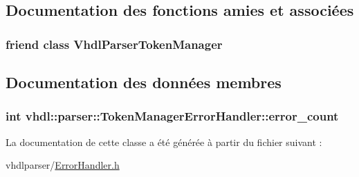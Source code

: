\subsection{Documentation des fonctions amies et associées}
\hypertarget{classvhdl_1_1parser_1_1_token_manager_error_handler_aff28441094086f5cbf8ee8f34a8bc9a4}{}
\subsubsection[{Vhdl\+Parser\+Token\+Manager}]{\setlength{\rightskip}{0pt plus 5cm}friend class {\bf Vhdl\+Parser\+Token\+Manager}\hspace{0.3cm}{\ttfamily [friend]}}\label{classvhdl_1_1parser_1_1_token_manager_error_handler_aff28441094086f5cbf8ee8f34a8bc9a4}


\subsection{Documentation des données membres}
\hypertarget{classvhdl_1_1parser_1_1_token_manager_error_handler_a6d2fbf9bff5de1775a78dc4872ccdca5}{}
\subsubsection[{error\+\_\+count}]{\setlength{\rightskip}{0pt plus 5cm}int vhdl\+::parser\+::\+Token\+Manager\+Error\+Handler\+::error\+\_\+count\hspace{0.3cm}{\ttfamily [protected]}}\label{classvhdl_1_1parser_1_1_token_manager_error_handler_a6d2fbf9bff5de1775a78dc4872ccdca5}


La documentation de cette classe a été générée à partir du fichier suivant \+:\begin{DoxyCompactItemize}
\item 
vhdlparser/\hyperlink{_error_handler_8h}{Error\+Handler.\+h}\end{DoxyCompactItemize}
